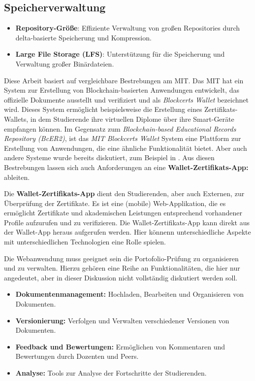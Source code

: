 \documentclass[conference]{IEEEtran}
\begin{document}
\begin{itemize}
    \subsection{Speicherverwaltung}
\begin{itemize}
    \item \textbf{Repository-Größe}: Effiziente Verwaltung von großen Repositories durch delta-basierte Speicherung und Kompression.
     \item \textbf{Large File Storage (LFS)}: Unterstützung für die Speicherung und Verwaltung großer Binärdateien.
    \end{itemize}

\end{itemize}

Diese Arbeit basiert auf vergleichbare Bestrebungen am MIT. Das MIT hat ein System zur Erstellung von Blockchain-basierten Anwendungen entwickelt, das offizielle Dokumente ausstellt und verifiziert und als \textit{Blockcerts Wallet} bezeichnet wird. Dieses System ermöglicht beispielsweise die Erstellung eines Zertifikats-Wallets, in dem Studierende ihre virtuellen Diplome über ihre Smart-Geräte empfangen können. Im Gegensatz zum \textit{Blockchain-based Educational Records Repository (BcER2)}, ist das \textit{MIT Blockcerts Wallet} System eine Plattform zur Erstellung von Anwendungen, die eine ähnliche Funktionalität bietet. Aber auch andere Systeme wurde bereits diskutiert, zum Beispiel in \cite{alammary2019blockchain}.
Aus diesen Bestrebungen lassen sich auch Anforderungen an eine \textbf{Wallet-Zertifikats-App:} ableiten.

Die \textbf{Wallet-Zertifikats-App} dient den Studierenden, aber auch Externen, zur Überprüfung der Zertifikate. Es ist eine (mobile) Web-Applikation, die es ermöglicht Zertifikate und akademischen Leistungen entsprechend vorhandener Profile aufzurufen und zu verifizieren. Die Wallet-Zertifikats-App kann direkt aus der Wallet-App heraus aufgerufen werden. Hier könnenn unterschiedliche Aspekte mit unterschiedlichen Technologien eine Rolle spielen. 

Die Webanwendung muss geeignet sein die Portofolio-Prüfung zu organisieren und zu verwalten. Hierzu gehören eine Reihe an Funktionalitäten, die hier nur angedeutet, aber in dieser Diskussion nicht vollständig diskutiert werden soll. 
\begin{itemize}
    \item \textbf{Dokumentenmanagement:} Hochladen, Bearbeiten und Organisieren von Dokumenten.
    \item \textbf{Versionierung:} Verfolgen und Verwalten verschiedener Versionen von Dokumenten.
    \item \textbf{Feedback und Bewertungen:} Ermöglichen von Kommentaren und Bewertungen durch Dozenten und Peers.
    \item \textbf{Analyse:} Tools zur Analyse der Fortschritte der Studierenden.
\end{itemize}
\end{document}
